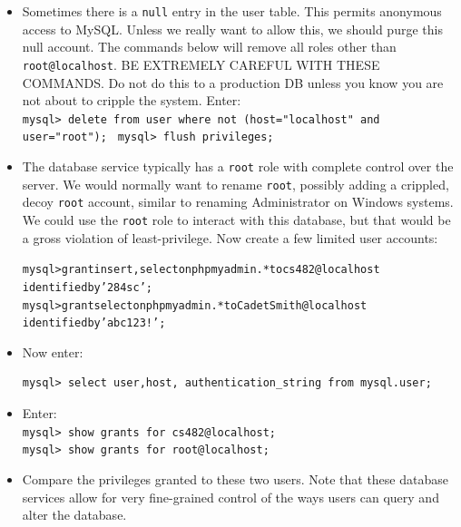 \documentclass{article}
\begin{document}


\begin{itemize}
\item Sometimes there is a {\tt null} entry in the user table. This permits anonymous access to MySQL. Unless we really want to allow this, we should purge this null account. The commands below will remove all roles other than {\tt root@localhost}. BE EXTREMELY CAREFUL WITH THESE COMMANDS. Do not do this to a production DB unless you know you are not about to cripple the system. Enter: \\
	{\tt mysql> delete from user where not (host="localhost" and user="root");  }
	{\tt mysql> flush privileges; }

\item The database service typically has a {\tt root} role with complete control over the server. We would normally want to rename {\tt root}, possibly adding a crippled, decoy {\tt root} account, similar to renaming Administrator on Windows systems.  We could use the {\tt root} role to interact with this database, but that would be a gross violation of least-privilege. Now create a few limited user accounts: 
\begin{alltt}
mysql> grant insert,select on phpmyadmin.* to cs482@localhost
identified by '284sc'; 
mysql> grant select on phpmyadmin.* to CadetSmith@localhost 
identified by 'abc123!';
\end{alltt}

\item Now enter:	
\begin{verbatim}
mysql> select user,host, authentication_string from mysql.user;
\end{verbatim}

\end{itemize}

\begin{itemize}
\item Enter:	 \\
{\tt mysql> show grants for cs482@localhost;} \\
{\tt mysql> show grants for root@localhost;}

\item Compare the privileges granted to these two users.  Note that these database services allow for very fine-grained control of the ways users can query and alter the database.
\end{itemize}
\end{document}

